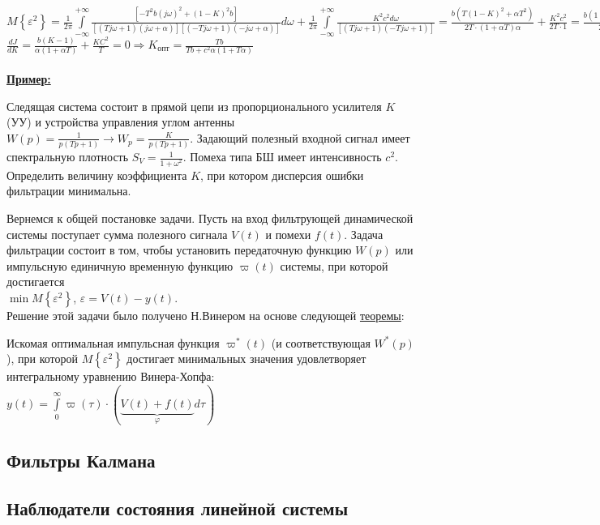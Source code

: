 \documentclass[preprint,russian,a5paper,10pt,twoside,mediummath]{ncc}
\newcommand{\ExampleMy}{\vspace{\baselineskip}\textbf{\underline{Пример:}}\nopagebreak\par}
\begin{document}
$M\left\{ {{\varepsilon }^{2}} \right\}=\frac{1}{2\pi }\int\limits_{-\infty }^{+\infty }{\frac{\left[ -{{T}^{2}}b{{\left( j\omega  \right)}^{2}}+{{\left( 1-K \right)}^{2}}b \right]}{\left[ \left( Tj\omega +1 \right)\left( j\omega +\alpha  \right) \right]\left[ \left( -Tj\omega +1 \right)\left( -j\omega +\alpha  \right) \right]}}d\omega +\frac{1}{2\pi }\int\limits_{-\infty }^{+\infty }{\frac{{{K}^{2}}{{c}^{2}}d\omega }{\left[ \left( Tj\omega +1 \right)\left( -Tj\omega +1 \right) \right]}}=\frac{b\left( T{{\left( 1-K \right)}^{2}}+\alpha {{T}^{2}} \right)}{2T\cdot \left( 1+\alpha T \right)\alpha }+\frac{{{K}^{2}}{{c}^{2}}}{2T\cdot 1}=\frac{b\left( 1+T\alpha -2K+{{K}^{2}} \right)}{2\alpha \cdot \left( 1+\alpha T \right)}+\frac{{{K}^{2}}{{c}^{2}}}{2T}$
\\$\frac{dJ}{dK}=\frac{b\left( K-1 \right)}{\alpha \left( 1+\alpha T \right)}+\frac{K{{C}^{2}}}{T}=0\Rightarrow K_{\textit{опт}}=\frac{Tb}{Tb+{{c}^{2}}\alpha \left( 1+T\alpha  \right)}$
\\\\\ExampleMy Следящая система состоит в прямой цепи из пропорционального усилителя $K$ (УУ) и устройства управления углом антенны $W\left( p \right)=\frac{1}{p\left( Tp+1 \right)}\to {{W}_{p}}=\frac{K}{p\left( Tp+1 \right)}$. Задающий полезный входной сигнал имеет спектральную плотность ${{S}_{V}}=\frac{1}{1+{{\omega }^{2}}}$. Помеха типа БШ имеет интенсивность ${{c}^{2}}$. Определить величину коэффициента $K$, при котором дисперсия ошибки фильтрации минимальна. 
\par Вернемся к общей постановке задачи. Пусть на вход фильтрующей динамической системы поступает сумма полезного сигнала $V\left( t \right)$ и помехи $f\left( t \right)$. Задача фильтрации состоит в том, чтобы установить передаточную функцию $W\left( p \right)$ или импульсную единичную временную функцию $\varpi \left( t \right)$ системы, при которой достигается 
\\$\min M\left\{ {{\varepsilon }^{2}} \right\}$, $\varepsilon =V\left( t \right)-y\left( t \right)$. 
\\Решение этой задачи было получено Н.Винером на основе следующей \underline{теоремы}:
\par Искомая оптимальная импульсная функция ${{\varpi }^{*}}\left( t \right)$ (и соответствующая 
 ${{W}^{*}}\left( p \right)$), при которой $M\left\{ {{\varepsilon }^{2}} \right\}$ достигает минимальных значения удовлетворяет интегральному уравнению Винера-Хопфа: $y\left( t \right)=\int\limits_{0}^{\infty }{\varpi \left( \tau  \right)}\cdot \left( \underbrace{V\left( t \right)+f\left( t \right)}_{\varphi }d\tau  \right)$  
 
   
	\subsection{Фильтры Калмана\label{stochastic:filters}}
 
	\subsection{Наблюдатели состояния линейной системы\label{stochastic:observers}}
\end{document}

